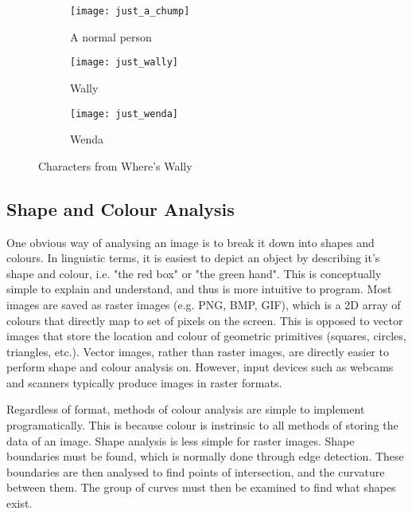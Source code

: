 \documentclass[../main.tex]{subfiles}
\begin{document}
    \begin{figure}[h]
    \centering
      \begin{subfigure}[b]{0.3\textwidth}
        \centering
        \texttt{[image: just\_a\_chump]}   
        \caption{A normal person}
        \label{justachump}
      \end{subfigure}
      \begin{subfigure}[b]{0.3\textwidth}
        \centering
        \texttt{[image: just\_wally]}   
        \caption{Wally}
        \label{justwally}
      \end{subfigure}
      \begin{subfigure}[b]{0.3\textwidth}
        \centering
        \texttt{[image: just\_wenda]}   
        \caption{Wenda}
        \label{justwenda}
      \end{subfigure}
    \caption{Characters from Where's Wally}
    \label{wallychars}
    \end{figure}
    \subsection{Shape and Colour Analysis}
    One obvious way of analysing an image is to break it down into shapes and colours.
    In linguistic terms, it is easiest to depict an object by describing it's shape and colour, i.e. "the red box" or "the green hand".
    This is conceptually simple to explain and understand, and thus is more intuitive to program.
    Most images are saved as raster images (e.g. PNG, BMP, GIF), which is a 2D array of colours that directly map to set of pixels on the screen.
    This is opposed to vector images that store the location and colour of geometric primitives (squares, circles, triangles, etc.).
    Vector images, rather than raster images, are directly easier to perform shape and colour analysis on.
    However, input devices such as webcams and scanners typically produce images in raster formats.

    Regardless of format, methods of colour analysis are simple to implement programatically.
    This is because colour is instrinsic to all methods of storing the data of an image.
    Shape analysis is less simple for raster images.
    Shape boundaries must be found, which is normally done through edge detection.
    These boundaries are then analysed to find points of intersection, and the curvature between them.
    The group of curves must then be examined to find what shapes exist.
\end{document}
